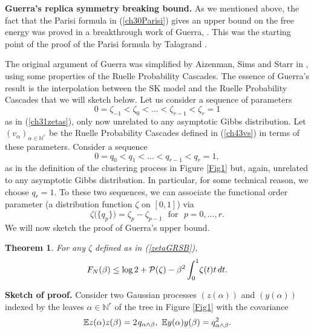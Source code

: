 \documentclass[12pt]{article}
\newcommand{\PP}{{\cal P}}
\newcommand{\smsp}{\hspace{0.3mm}}
\newcommand{\e}{\mathbb{E}}
\newcommand{\Natural}{\mathbb{N}}
\newtheorem{theorem}{Theorem}
\theoremstyle{nonumberplain}
\begin{document}
\textbf{Guerra's replica symmetry breaking bound.} As we mentioned above, the fact that the Parisi formula in (\ref{ch30Parisi}) gives an upper bound on the free energy was proved in a breakthrough work of Guerra, \cite{Guerra}. This was the starting point of the proof of the Parisi formula by Talagrand \cite{TPF}.

The original argument of Guerra was simplified by Aizenman, Sims and Starr in \cite{AS2}, using some properties of the Ruelle Probability Cascades. The essence of Guerra's result is the interpolation between the SK model and the Ruelle Probability Cascades that we will sketch below.  Let us consider a sequence of parameters 
\begin{equation}
0=\zeta_{-1}< \zeta_0 <\ldots < \zeta_{r-1} < \zeta_r = 1
\end{equation}
as in (\ref{ch31zetas}), only now unrelated to any asymptotic Gibbs distribution. Let $(v_\alpha)_{\alpha\in\Natural^r}$ be the Ruelle Probability Cascades defined in (\ref{ch43vs}) in terms of these parameters. Consider a sequence
\begin{equation}
0=q_0< q_1 <\ldots <q_{r-1}< q_r =1,
\end{equation}
as in the definition of the clustering process in Figure \ref{Fig1} but, again, unrelated to any asymptotic Gibbs distribution. In particular, for some technical reason, we choose $q_r=1$. To these two sequences, we can associate the functional order parameter (a distribution function $\zeta$ on $[0,1]$) via
\begin{equation}
\zeta\bigl(\bigl\{q_p\bigr\}\bigr) = \zeta_{p} - \zeta_{p-1}
\,\,\mbox{ for }\,\,
p=0,\ldots, r.
\label{zetaGRSB}
\end{equation}
We will now sketch the proof of Guerra's upper bound.
\begin{theorem}
For any $\zeta$ defined as in (\ref{zetaGRSB}),
\begin{equation}
F_N(\beta) \leq \log 2 + \PP(\zeta) -{\beta^2}\int_{0}^{1}\! \zeta(t)t\, dt.
\label{FNPzeta2}
\end{equation}
\end{theorem}
\textbf{Sketch of proof.} Consider two Gaussian processes $(z(\alpha))$ and $(y(\alpha))$ indexed by the leaves ${\alpha\in \Natural^r}$ of the tree in Figure \ref{Fig1} with the covariance
\begin{equation}
\e z(\alpha) z(\beta) = 2 \smsp q_{\alpha\wedge \beta},\,\,
\e y(\alpha) y(\beta) = q_{\alpha\wedge\beta}^2.
\label{ch12CovzyG}
\end{equation}
\end{document}
